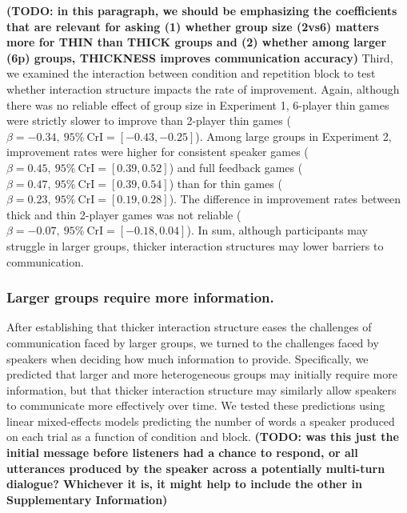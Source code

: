 \documentclass[
  english,
  a4paper,
]{article}
\begin{document}
\textbf{(TODO: in this paragraph, we should be emphasizing the coefficients that are relevant for asking (1) whether group size (2vs6) matters more for THIN than THICK groups and (2) whether among larger (6p) groups, THICKNESS improves communication accuracy)}
Third, we examined the interaction between condition and repetition block to test whether interaction structure impacts the rate of improvement.
Again, although there was no reliable effect of group size in Experiment 1, 6-player thin games were strictly slower to improve than 2-player thin games (\(\beta=-0.34,\:95\%\:\mathrm{CrI}=[-0.43, -0.25]\)).
Among large groups in Experiment 2, improvement rates were higher for consistent speaker games (\(\beta=0.45,\:95\%\:\mathrm{CrI}=[0.39, 0.52]\)) and full feedback games (\(\beta=0.47,\:95\%\:\mathrm{CrI}=[0.39, 0.54]\)) than for thin games ( \(\beta=0.23,\:95\%\:\mathrm{CrI}=[0.19, 0.28]\)).
The difference in improvement rates between thick and thin 2-player games was not reliable (\(\beta=-0.07,\:95\%\:\mathrm{CrI}=[-0.18, 0.04]\)).
In sum, although participants may struggle in larger groups, thicker interaction structures may lower barriers to communication.

\hypertarget{larger-groups-require-more-information.}{%
\subsubsection{Larger groups require more information.}\label{larger-groups-require-more-information.}}

After establishing that thicker interaction structure eases the challenges of communication faced by larger groups, we turned to the challenges faced by speakers when deciding how much information to provide.
Specifically, we predicted that larger and more heterogeneous groups may initially require more information, but that thicker interaction structure may similarly allow speakers to communicate more effectively over time.
We tested these predictions using linear mixed-effects models predicting the number of words a speaker produced on each trial as a function of condition and block.
\textbf{(TODO: was this just the initial message before listeners had a chance to respond, or all utterances produced by the speaker across a potentially multi-turn dialogue? Whichever it is, it might help to include the other in Supplementary Information)}
\end{document}
